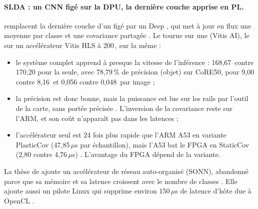 \paragraph{SLDA : un CNN figé sur la DPU, la dernière couche apprise en PL.}
\citet{2021-piyasena-accelerating-continual-learning-edge-fpga} remplacent la dernière couche
d'un  figé par un Deep , qui met à jour en flux une moyenne par classe et une
covariance partagée . Le  tourne sur une   (Vitis AI), le 
sur un accélérateur Vitis HLS à 200\,, sur la même   :
\begin{itemize}
  \item le système complet apprend à presque la vitesse de l'inférence : 168,67\, contre
    170,20 pour la  seule, avec 78,79\,\% de précision (objet) sur CoRE50, pour 9,00\,
    contre 8,16\, et 0,056 contre 0,048\, par image  ;
  \item la précision est donc bonne, mais la puissance est lue sur les rails par l'outil de
    la carte, sans portée précisée . L'inversion de la covariance reste sur l'ARM,
    et son coût n'apparaît pas dans les latences  ;
  \item l'accélérateur seul est 24 fois plus rapide que l'ARM A53 en variante PlasticCov
    (47,85\,$\mu$s par échantillon), mais l'A53 bat le FPGA en StaticCov (2,80 contre
    4,76\,$\mu$s) . L'avantage du FPGA dépend de la variante.
\end{itemize}
La thèse de \citet{2021-piyasena-fpga-acceleration-continual-learning} ajoute un
accélérateur de réseau auto-organisé (SONN), abandonné parce que sa mémoire et sa latence
croissent avec le nombre de classes . Elle ajoute aussi un pilote Linux qui
supprime environ 150\,$\mu$s de latence d'hôte due à OpenCL .

